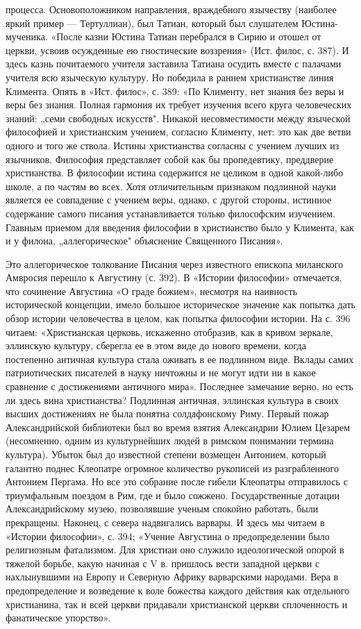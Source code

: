 процесса. Основоположником направления, враждебного язычеству (наиболее яркий
пример --- Тертуллиан), был Татиан, который был слушателем Юстина-мученика.
«После казни Юстина Татиан перебрался в Сирию и отошел от церкви, усвоив
осужденные ею гностические воззрения» (Ист. филос, с. 387). И здесь казнь
почитаемого учителя заставила Татиана осудить вместе с палачами учителя всю
языческую культуру. Но победила в раннем христианстве линия Климента. Опять в
«Ист. филос», с. 389: «По Клименту, нет знания без веры и веры без знания.
Полная гармония их требует изучения всего круга человеческих знаний: „семи
свободных искусств". Никакой несовместимости между языческой философией и
христианским учением, согласно Клименту, нет: это как две ветви одного и того
же ствола. Истины христианства согласны с учением лучших из язычников.
Философия представляет собой как бы пропедевтику, преддверие христианства. В
философии истина содержится не целиком в одной какой-либо школе, а по частям во
всех. Хотя отличительным признаком подлинной науки является ее совпадение с
учением веры, однако, с другой стороны, истинное содержание самого писания
устанавливается только философским изучением. Главным приемом для введения
философии в христианство было у Климента, как и у филона, „аллегорическое"
объяснение Священного Писания».

Это аллегорическое толкование Писания через известного епископа миланского
Амвросия перешло к Августину (с. 392). В «Истории философии» отмечается, что
сочинение Августина «О граде божием», несмотря на наивность исторической
концепции, имело большое историческое значение как попытка дать обзор истории
человечества в целом, как попытка философии истории. На с. 396 читаем:
«Христианская церковь, искаженно отобразив, как в кривом зеркале, эллинскую
культуру, сберегла ее в этом виде до нового времени, когда постепенно античная
культура стала оживать в ее подлинном виде. Вклады самих патриотических
писателей в науку ничтожны и не могут идти ни в
какое сравнение с достижениями античного мира». Последнее замечание верно, но
есть ли здесь вина христианства? Подлинная античная, эллинская культура в своих
высших достижениях не была понятна солдафонскому Риму. Первый пожар
Александрийской библиотеки был во время взятия Александрии Юлием Цезарем
(несомненно, одним из культурнейших людей в римском понимании термина
культура). Убыток был до известной степени возмещен Антонием, который галантно
поднес Клеопатре огромное количество рукописей из разграбленного Антонием
Пергама. Но все это собрание после гибели Клеопатры отправилось с триумфальным
поездом в Рим, где и было сожжено. Государственные дотации Александрийскому
музею, позволявшие ученым спокойно работать, были прекращены. Наконец, с севера
надвигались варвары. И здесь мы читаем в «Истории философии», с. 394; «Учение
Августина о предопределении было религиозным фатализмом. Для христиан оно
служило идеологической опорой в тяжелой борьбе, какую начиная с V в. пришлось
вести западной церкви с нахлынувшими на Европу и Северную Африку варварскими
народами. Вера в предопределение и возведение к воле божества каждого действия
как отдельного христианина, так и всей церкви придавали христианской церкви
сплоченность и фанатическое упорство».

